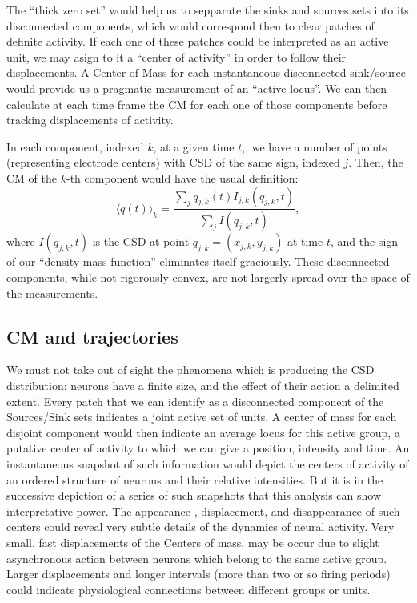 \documentclass[12pt]{article}
\begin{document}
The ``thick zero set'' would help us to sepparate the sinks and sources sets into
its disconnected components, which would correspond then to clear patches of
definite activity. If each one of these patches could be
interpreted as an active unit,
we may asign to it a ``center of activity'' in order to follow their displacements.
A Center of Mass for each instantaneous disconnected sink/source would provide us
a pragmatic measurement of an ``active locus''. We can then calculate at each time
frame the CM for each one of those components before tracking displacements of activity.


In each component, indexed $k$, at a given time $t$,, we have a number of points
(representing electrode centers)
with CSD of the same sign, indexed $j$. Then, the CM of the $k$-th
component would have the usual definition:
\begin{equation}\label{cmparadisj}
   \langle q(t) \rangle_k =\frac{\sum_j q_{j,k} (t) I_{j,k} (q_{j,k},t)}
           {\sum_j I(q_{j,k},t)},
\end{equation}
where $I(q_{j,k},t)$ is the CSD at point $q_{j,k}=(x_{j,k}, y_{j,k})$ at time $t$,
and the
sign of our ``density mass function'' eliminates itself graciously.
These disconnected components, while not rigorously convex,
are not largerly spread over the space of the measurements.



\subsection{CM and trajectories}

We must not take out of sight the phenomena which is producing the CSD distribution:
neurons have a finite size, and the effect of their action a delimited extent.
Every patch that we can identify as a disconnected component of the Sources/Sink
sets indicates a  joint active set of units. A center of mass for each disjoint
component would then indicate an average locus for this active group, a putative center of activity to which we can give a position, intensity and time. An instantaneous snapshot of such information would depict the centers of activity of an ordered structure of neurons and their relative intensities. But it is in the successive depiction of a series of such snapshots that this analysis can show interpretative power. The appearance , displacement, and disappearance of such centers could reveal very subtle details of the dynamics of neural activity. Very small, fast displacements of the Centers of mass, may be occur due to slight asynchronous action between neurons which belong to the same active group.
Larger displacements and  longer intervals (more than two or so firing periods)
could indicate physiological connections between different groups or units.
\end{document}

